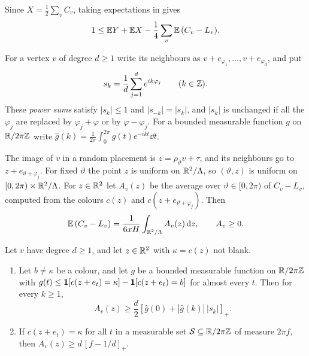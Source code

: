 \documentclass[11pt,colorlinks]{charlie}
\newcommand{\pos}[1]{\left[#1\right]_+}
\begin{document}
Since $X=\frac12\sum_vC_v$, taking expectations in  gives
\begin{equation}\label{eq:onebad}
 1\le\mathbb{E} Y+\mathbb{E} X-\frac14\sum_v\mathbb{E}\,(C_v-L_v).
\end{equation}

For a vertex $v$ of degree $d\ge1$ write its neighbours as $v+e_{\varphi_1},\dots,v+e_{\varphi_d}$, and put
\[
 s_k=\frac1d\sum_{j=1}^de^{ik\varphi_j}\qquad(k\in\mathbb{Z}).
\]
These \emph{power sums} satisfy $|s_k|\le1$ and $|s_{-k}|=|s_k|$, and $|s_k|$ is unchanged if all the $\varphi_j$ are replaced by $\varphi_j+\varphi$ or by $\varphi-\varphi_j$. For a bounded measurable function $g$ on $\mathbb{R}/2\pi\mathbb{Z}$ write $\hat g(k)=\frac1{2\pi}\int_0^{2\pi}g(t)e^{-ikt}\dd t$.

The image of $v$ in a random placement is $z=\rho_\vartheta v+\tau$, and its neighbours go to $z+e_{\vartheta+\varphi_j}$. For fixed $\vartheta$ the point $z$ is uniform on $\mathbb{R}^2/\Lambda$, so $(\vartheta,z)$ is uniform on $[0,2\pi)\times\mathbb{R}^2/\Lambda$. For $z\in\mathbb{R}^2$ let $A_v(z)$ be the average over $\vartheta\in[0,2\pi)$ of $C_v-L_v$, computed from the colours $c(z)$ and $c(z+e_{\vartheta+\varphi_j})$. Then
\begin{equation}\label{eq:Av}
 \mathbb{E}\,(C_v-L_v)=\frac1{6xH}\int_{\mathbb{R}^2/\Lambda}A_v(z)\,\mathrm{d} z,\qquad A_v\ge0 .
\end{equation}

\begin{lemma}\label{lem:starfourier}
Let $v$ have degree $d\ge1$, and let $z\in\mathbb{R}^2$ with $\kappa=c(z)$ not blank.
\begin{enumerate}
\item Let $b\ne\kappa$ be a colour, and let $g$ be a bounded measurable function on $\mathbb{R}/2\pi\mathbb{Z}$ with $g(t)\le\mathbf{1}[c(z+e_t)=\kappa]-\mathbf{1}[c(z+e_t)=b]$ for almost every $t$. Then for every $k\ge1$,
\[
 A_v(z)\ge\frac d2\pos{\hat g(0)+|\hat g(k)|\,|s_k|}.
\]
\item If $c(z+e_t)=\kappa$ for all $t$ in a measurable set $\mathcal S\subseteq\mathbb{R}/2\pi\mathbb{Z}$ of measure $2\pi f$, then $A_v(z)\ge d\,\pos{f-1/d}$.
\end{enumerate}
\end{lemma}
\end{document}
